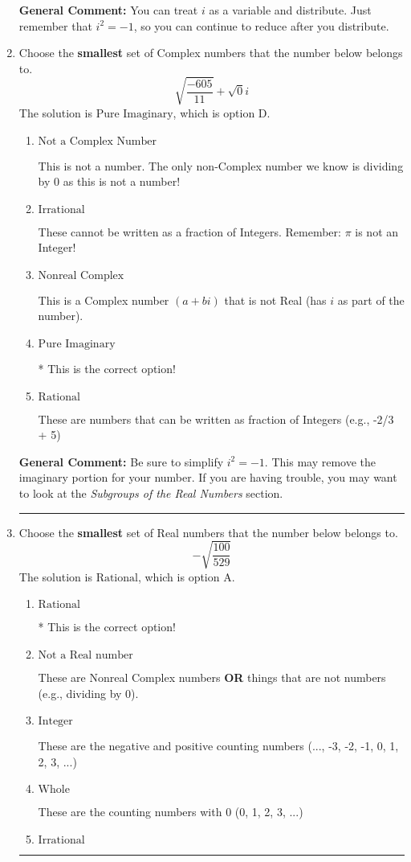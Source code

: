 \documentclass{extbook}[14pt]
\newcommand{\litem}[1]{\item #1

\rule{\textwidth}{0.4pt}}
\begin{document}
\begin{enumerate}
{\textbf{General Comment:} You can treat $i$ as a variable and distribute. Just remember that $i^2=-1$, so you can continue to reduce after you distribute.
}
\litem{
Choose the \textbf{smallest} set of Complex numbers that the number below belongs to.
\[ \sqrt{\frac{-605}{11}}+\sqrt{0}i \]The solution is \( \text{Pure Imaginary} \), which is option D.\begin{enumerate}[label=\Alph*.]
\item \( \text{Not a Complex Number} \)

This is not a number. The only non-Complex number we know is dividing by 0 as this is not a number!
\item \( \text{Irrational} \)

These cannot be written as a fraction of Integers. Remember: $\pi$ is not an Integer!
\item \( \text{Nonreal Complex} \)

This is a Complex number $(a+bi)$ that is not Real (has $i$ as part of the number).
\item \( \text{Pure Imaginary} \)

* This is the correct option!
\item \( \text{Rational} \)

These are numbers that can be written as fraction of Integers (e.g., -2/3 + 5)
\end{enumerate}

\textbf{General Comment:} Be sure to simplify $i^2 = -1$. This may remove the imaginary portion for your number. If you are having trouble, you may want to look at the \textit{Subgroups of the Real Numbers} section.
}
\litem{
Choose the \textbf{smallest} set of Real numbers that the number below belongs to.
\[ -\sqrt{\frac{100}{529}} \]The solution is \( \text{Rational} \), which is option A.\begin{enumerate}[label=\Alph*.]
\item \( \text{Rational} \)

* This is the correct option!
\item \( \text{Not a Real number} \)

These are Nonreal Complex numbers \textbf{OR} things that are not numbers (e.g., dividing by 0).
\item \( \text{Integer} \)

These are the negative and positive counting numbers (..., -3, -2, -1, 0, 1, 2, 3, ...)
\item \( \text{Whole} \)

These are the counting numbers with 0 (0, 1, 2, 3, ...)
\item \( \text{Irrational} \)


\end{enumerate}}
\end{enumerate}
\end{document}
